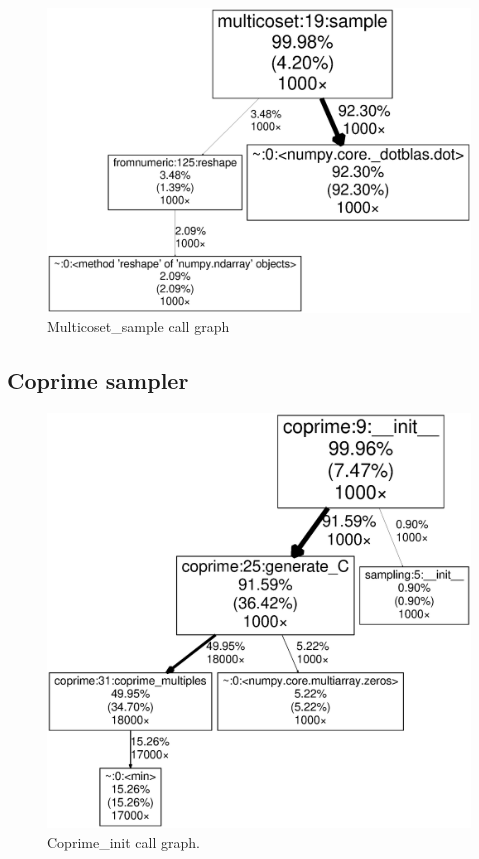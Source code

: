 \documentclass[a4paper, openany, oneside]{memoir}
\begin{document}
\begin{figure}[H]
    \centering
    \includegraphics[width=0.8\linewidth]{MultiCoset_sample}
    \caption{Multicoset\_sample call graph}
    \label{fig:Multicoset_sample}
\end{figure}

\subsection{Coprime sampler}
\label{sub:coprime_sampler}

\begin{figure}[H]
    \centering
    \includegraphics[width=0.8\linewidth]{Coprime_init}
    \caption{Coprime\_init call graph.}
    \label{fig:Coprime_init}
\end{figure}
\end{document}
